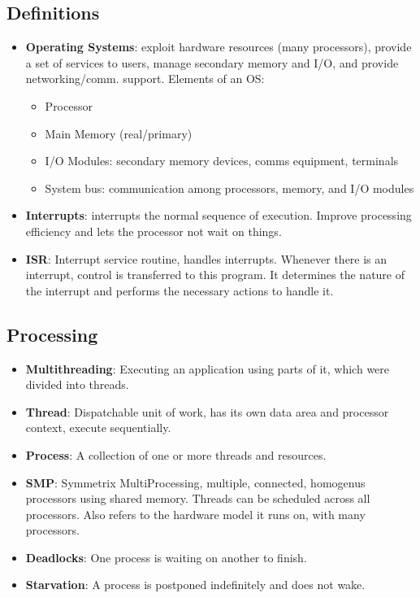 \documentclass[fontsize=5pt]{scrartcl}
\begin{document}
\begin{multicols}{3}
  \section{Definitions}
    \begin{itemize}
      \item \textbf{Operating Systems}: exploit hardware resources (many processors), provide a set of services to users, manage secondary memory and I/O, %
          and provide networking/comm. support. Elements of an OS:
      \begin{itemize}
        \item Processor
        \item Main Memory (real/primary)
        \item I/O Modules: secondary memory devices, comms equipment, terminals
        \item System bus: communication among processors, memory, and I/O modules
       \end{itemize}
       \item \textbf{Interrupts}: interrupts the normal sequence of execution. Improve processing efficiency and lets the processor not wait on things.
       \item \textbf{ISR}: Interrupt service routine, handles interrupts. Whenever  there is an interrupt, control is transferred to this program.  %
                       It determines the nature of the interrupt and performs the necessary actions to handle it.

    \end{itemize}
     \subsection{Processing}
      \begin{itemize}       
       \item \textbf{Multithreading}: Executing an application using parts of it, which were divided into threads. 
       \item \textbf{Thread}: Dispatchable unit of work, has its own data area and processor context, execute sequentially.
       \item \textbf{Process}: A collection of one or more threads and resources.
       \item \textbf{SMP}: Symmetrix MultiProcessing, multiple, connected, homogenus processors using shared memory.
                           Threads can be scheduled across all processors. Also refers to the hardware model it runs on, with
                           many processors.
        \item \textbf{Deadlocks}: One process is waiting on another to finish.
        \item \textbf{Starvation}: A process is postponed indefinitely and does not wake.
      \end{itemize}    


\end{multicols}
\end{document}
